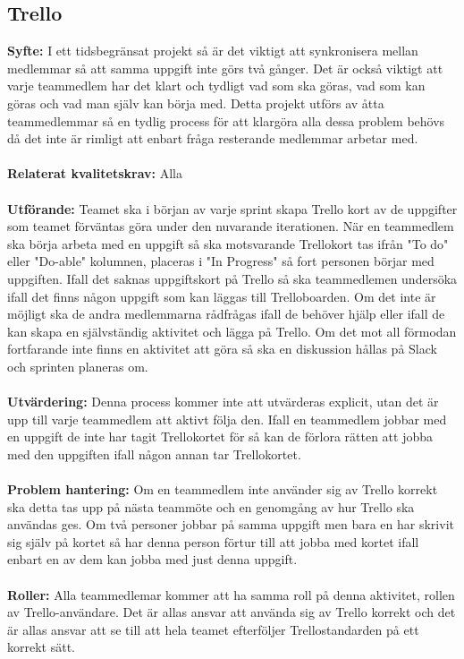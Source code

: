 \documentclass[10pt]{article}
\begin{document}
	\subsection{Trello}
	\textbf{Syfte:}	I ett tidsbegränsat projekt så är det viktigt att synkronisera mellan medlemmar så att samma uppgift inte görs två gånger. Det är också viktigt att varje teammedlem har det klart och tydligt vad som ska göras, vad som kan göras och vad man själv kan börja med. Detta projekt utförs av åtta teammedlemmar så en tydlig process för att klargöra alla dessa problem behövs då det inte är rimligt att enbart fråga resterande medlemmar arbetar med.
	\\\\
	\textbf{Relaterat kvalitetskrav:} Alla
	\\\\
	\textbf{Utförande:} Teamet ska i början av varje sprint skapa Trello kort av de uppgifter som teamet förväntas göra under den nuvarande iterationen. När en teammedlem ska börja arbeta med en uppgift så ska motsvarande Trellokort tas ifrån "To do" eller "Do-able" kolumnen, placeras i "In Progress" så fort personen börjar med uppgiften. Ifall det saknas uppgiftskort på Trello så ska teammedlemen undersöka ifall det finns någon uppgift som kan läggas till Trelloboarden. Om det inte är möjligt ska de andra medlemmarna rådfrågas ifall de behöver hjälp eller ifall de kan skapa en självständig aktivitet och lägga på Trello. Om det mot all förmodan fortfarande inte finns en aktivitet att göra så ska en diskussion hållas på Slack och sprinten planeras om.
	\\\\
	\textbf{Utvärdering:} Denna process kommer inte att utvärderas explicit, utan det är upp till varje teammedlem att aktivt följa den. Ifall en teammedlem jobbar med en uppgift de inte har tagit Trellokortet för så kan de förlora rätten att jobba med den uppgiften ifall någon annan tar Trellokortet.
	\\\\
	\textbf{Problem hantering:} Om en teammedlem inte använder sig av Trello korrekt ska detta tas upp på nästa teammöte och en genomgång av hur Trello ska användas ges. Om två personer jobbar på samma uppgift men bara en har skrivit sig själv på kortet så har denna person förtur till att jobba med kortet ifall enbart en av dem kan jobba med just denna uppgift.
	\\\\
	\textbf{Roller:} Alla teammedlemar kommer att ha samma roll på denna aktivitet, rollen av Trello-användare. Det är allas ansvar att använda sig av Trello korrekt och det är allas ansvar att se till att hela teamet efterföljer Trellostandarden på ett korrekt sätt.
	
\end{document}
